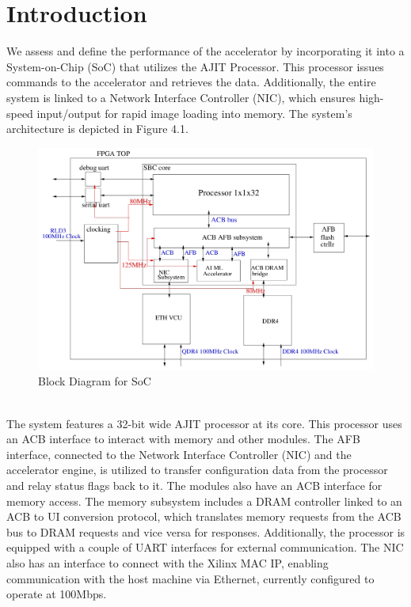 \section{Introduction}
We assess and define the performance of the accelerator by incorporating it into a System-on-Chip (SoC) that utilizes the AJIT Processor. This processor issues commands to the accelerator and retrieves the data. Additionally, the entire system is linked to a Network Interface Controller (NIC), which ensures high-speed input/output for rapid image loading into memory. The system's architecture is depicted in Figure 4.1.
\begin{figure}[h]
    \centering
    \includegraphics[width=\linewidth]{../figures/vcu128.jpg}
    \caption{Block Diagram for SoC}
\end{figure}
\\
The system features a 32-bit wide AJIT processor at its core. This processor uses an ACB interface to interact with memory and other modules. The AFB interface, connected to the Network Interface Controller (NIC) and the accelerator engine, is utilized to transfer configuration data from the processor and relay status flags back to it. The modules also have an ACB interface for memory access. The memory subsystem includes a DRAM controller linked to an ACB to UI conversion protocol, which translates memory requests from the ACB bus to DRAM requests and vice versa for responses. Additionally, the processor is equipped with a couple of UART interfaces for external communication. The NIC also has an interface to connect with the Xilinx MAC IP, enabling communication with the host machine via Ethernet, currently configured to operate at 100Mbps.

